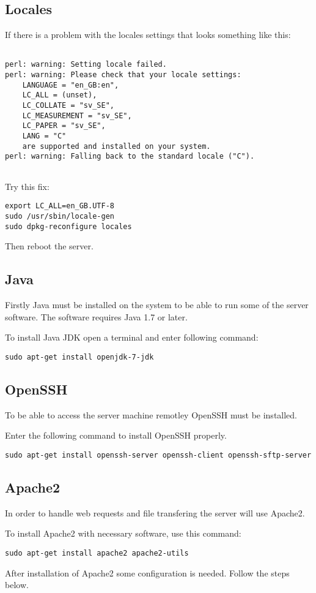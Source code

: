 \subsection{Locales}
If there is a problem with the locales settings that looks something like this:
\begin{verbatim}

perl: warning: Setting locale failed.
perl: warning: Please check that your locale settings:
	LANGUAGE = "en_GB:en",
	LC_ALL = (unset),
	LC_COLLATE = "sv_SE",
	LC_MEASUREMENT = "sv_SE",
	LC_PAPER = "sv_SE",
	LANG = "C"
    are supported and installed on your system.
perl: warning: Falling back to the standard locale ("C").


\end{verbatim}
Try this fix:
\begin{verbatim}
export LC_ALL=en_GB.UTF-8
sudo /usr/sbin/locale-gen 
sudo dpkg-reconfigure locales
\end{verbatim}
Then reboot the server.

\subsection{Java}
Firstly Java must be installed on the system to be able to run some of the server software. The software requires Java 1.7 or later. 

To install Java JDK open a terminal and enter following command:
\begin{verbatim}
sudo apt-get install openjdk-7-jdk
\end{verbatim}

\subsection{OpenSSH}
To be able to access the server machine remotley OpenSSH must be installed.

Enter the following command to install OpenSSH properly.
\begin{verbatim}
sudo apt-get install openssh-server openssh-client openssh-sftp-server
\end{verbatim}

\subsection{Apache2}\label{sec:exp_d_apache2}
In order to handle web requests and file transfering the server will use Apache2. 

To install Apache2 with necessary software, use this command:
\begin{verbatim}
sudo apt-get install apache2 apache2-utils
\end{verbatim}
After installation of Apache2 some configuration is needed. Follow the steps below.
